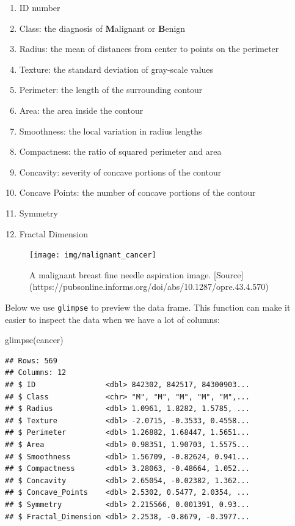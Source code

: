 \documentclass[
]{krantz}
\makeatletter
\newenvironment{Shaded}{\begin{snugshade}}{\end{snugshade}}
\newcommand{\FunctionTok}[1]{\textcolor[rgb]{0,0,0}{#1}}
\newcommand{\NormalTok}[1]{#1}
\providecommand{\tightlist}{%
  \setlength{\itemsep}{0pt}\setlength{\parskip}{0pt}}
\newenvironment{kframe}{%
\medskip{}
\setlength{\fboxsep}{.8em}
 \def\at@end@of@kframe{}%
 \ifinner\ifhmode%
  \def\at@end@of@kframe{\end{minipage}}%
  \begin{minipage}{\columnwidth}%
 \fi\fi%
 \def\FrameCommand##1{\hskip\@totalleftmargin \hskip-\fboxsep
 \colorbox{shadecolor}{##1}\hskip-\fboxsep
     \hskip-\linewidth \hskip-\@totalleftmargin \hskip\columnwidth}%
 \MakeFramed {\advance\hsize-\width
   \@totalleftmargin\z@ \linewidth\hsize
   \@setminipage}}%
 {\par\unskip\endMakeFramed%
 \at@end@of@kframe}
\renewenvironment{Shaded}{\begin{kframe}}{\end{kframe}}
\makeatother
\begin{document}
\begin{enumerate}
\def\labelenumi{\arabic{enumi}.}
\tightlist
\item
  ID number
\item
  Class: the diagnosis of \textbf{M}alignant or \textbf{B}enign
\item
  Radius: the mean of distances from center to points on the perimeter
\item
  Texture: the standard deviation of gray-scale values
\item
  Perimeter: the length of the surrounding contour
\item
  Area: the area inside the contour
\item
  Smoothness: the local variation in radius lengths
\item
  Compactness: the ratio of squared perimeter and area
\item
  Concavity: severity of concave portions of the contour
\item
  Concave Points: the number of concave portions of the contour
\item
  Symmetry
\item
  Fractal Dimension
\end{enumerate}

\begin{figure}
\texttt{[image: img/malignant\_cancer]} \caption{A malignant breast fine needle aspiration image. [Source](https://pubsonline.informs.org/doi/abs/10.1287/opre.43.4.570)}\label{fig:05-bc-cells}
\end{figure}

Below we use \texttt{glimpse} to preview the data frame. This function can make it easier to inspect the data when we have a lot of columns:

\begin{Shaded}
\begin{Highlighting}[]
\FunctionTok{glimpse}\NormalTok{(cancer)}
\end{Highlighting}
\end{Shaded}

\begin{verbatim}
## Rows: 569
## Columns: 12
## $ ID                <dbl> 842302, 842517, 84300903...
## $ Class             <chr> "M", "M", "M", "M", "M",...
## $ Radius            <dbl> 1.0961, 1.8282, 1.5785, ...
## $ Texture           <dbl> -2.0715, -0.3533, 0.4558...
## $ Perimeter         <dbl> 1.26882, 1.68447, 1.5651...
## $ Area              <dbl> 0.98351, 1.90703, 1.5575...
## $ Smoothness        <dbl> 1.56709, -0.82624, 0.941...
## $ Compactness       <dbl> 3.28063, -0.48664, 1.052...
## $ Concavity         <dbl> 2.65054, -0.02382, 1.362...
## $ Concave_Points    <dbl> 2.5302, 0.5477, 2.0354, ...
## $ Symmetry          <dbl> 2.215566, 0.001391, 0.93...
## $ Fractal_Dimension <dbl> 2.2538, -0.8679, -0.3977...
\end{verbatim}
\end{document}
